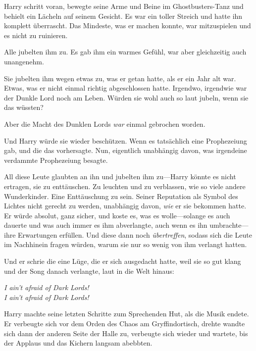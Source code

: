 Harry schritt voran, bewegte seine Arme und Beine im Ghostbusters-Tanz und behielt ein Lächeln auf seinem Gesicht. Es war ein toller Streich und hatte ihn komplett überrascht. Das Mindeste, was er machen konnte, war mitzuspielen und es nicht zu ruinieren.

Alle jubelten ihm zu. Es gab ihm ein warmes Gefühl, war aber gleichzeitig auch unangenehm.

Sie jubelten ihm wegen etwas zu, was er getan hatte, als er ein Jahr alt war. Etwas, was er nicht einmal richtig abgeschlossen hatte. Irgendwo, irgendwie war der Dunkle Lord noch am Leben. Würden sie wohl auch so laut jubeln, wenn sie das wüssten?

Aber die Macht des Dunklen Lords \emph{war} einmal gebrochen worden.

Und Harry würde sie wieder beschützen. Wenn es tatsächlich eine Prophezeiung gab, und die das vorhersagte. Nun, eigentlich unabhängig davon, was irgendeine verdammte Prophezeiung besagte.

All diese Leute glaubten an ihn und jubelten ihm zu—Harry könnte es nicht ertragen, sie zu enttäuschen. Zu leuchten und zu verblassen, wie so viele andere Wunderkinder. Eine Enttäuschung zu sein. Seiner Reputation als Symbol des Lichtes nicht gerecht zu werden, unabhängig davon, \emph{wie} er sie bekommen hatte. Er würde absolut, ganz sicher, und koste es, was es wolle—solange es auch dauerte und was auch immer es ihm abverlangte, auch wenn es ihn umbrachte—ihre Erwartungen erfüllen. Und diese dann noch \emph{übertreffen}, sodass sich die Leute im Nachhinein fragen würden, warum sie nur so wenig von ihm verlangt hatten.

Und er schrie die eine Lüge, die er sich ausgedacht hatte, weil sie so gut klang und der Song danach verlangte, laut in die Welt hinaus:

\begin{center}
\emph{I ain’t afraid of Dark Lords!\\
I ain’t afraid of Dark Lords!}
\end{center}

Harry machte seine letzten Schritte zum Sprechenden Hut, als die Musik endete. Er verbeugte sich vor dem Orden des Chaos am Gryffindortisch, drehte wandte sich dann der anderen Seite der Halle zu, verbeugte sich wieder und wartete, bis der Applaus und das Kichern langsam abebbten.


